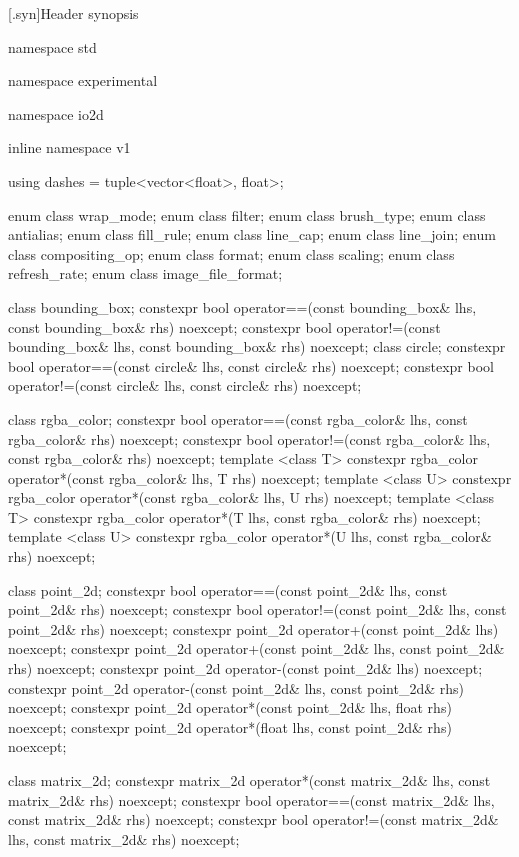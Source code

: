 [\iotwod.syn]{Header  synopsis}

%
%
\begin{codeblock}

namespace std { namespace experimental {
  namespace io2d { inline namespace v1 {

  using dashes = tuple<vector<float>, float>;

  enum class wrap_mode;
  enum class filter;
  enum class brush_type;
  enum class antialias;
  enum class fill_rule;
  enum class line_cap;
  enum class line_join;
  enum class compositing_op;
  enum class format;
  enum class scaling;
  enum class refresh_rate;
  enum class image_file_format;

  class bounding_box;
  constexpr bool operator==(const bounding_box& lhs, const bounding_box& rhs) 
    noexcept;
  constexpr bool operator!=(const bounding_box& lhs, const bounding_box& rhs) 
    noexcept;
  class circle;
  constexpr bool operator==(const circle& lhs, const circle& rhs) noexcept;
  constexpr bool operator!=(const circle& lhs, const circle& rhs) noexcept;

  class rgba_color;
  constexpr bool operator==(const rgba_color& lhs, const rgba_color& rhs) 
    noexcept;
  constexpr bool operator!=(const rgba_color& lhs, const rgba_color& rhs) 
    noexcept;
  template <class T>
  constexpr rgba_color operator*(const rgba_color& lhs, T rhs) noexcept;
  template <class U>
  constexpr rgba_color operator*(const rgba_color& lhs, U rhs) noexcept;
  template <class T>
  constexpr rgba_color operator*(T lhs, const rgba_color& rhs) noexcept;
  template <class U>
  constexpr rgba_color operator*(U lhs, const rgba_color& rhs) noexcept;

  class point_2d;
  constexpr bool operator==(const point_2d& lhs, const point_2d& rhs) 
    noexcept;
  constexpr bool operator!=(const point_2d& lhs, const point_2d& rhs) 
    noexcept;
  constexpr point_2d operator+(const point_2d& lhs) noexcept;
  constexpr point_2d operator+(const point_2d& lhs, const point_2d& rhs) 
    noexcept;
  constexpr point_2d operator-(const point_2d& lhs) noexcept;
  constexpr point_2d operator-(const point_2d& lhs, const point_2d& rhs) 
    noexcept;
  constexpr point_2d operator*(const point_2d& lhs, float rhs) noexcept;
  constexpr point_2d operator*(float lhs, const point_2d& rhs) noexcept;

  class matrix_2d;
  constexpr matrix_2d operator*(const matrix_2d& lhs, const matrix_2d& rhs) 
    noexcept;
  constexpr bool operator==(const matrix_2d& lhs, const matrix_2d& rhs) 
    noexcept;
  constexpr bool operator!=(const matrix_2d& lhs, const matrix_2d& rhs) 
    noexcept;

}}}}
\end{codeblock}
